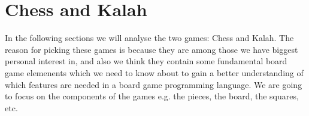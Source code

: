 \section{Chess and Kalah}

In the following sections we will analyse the two games: Chess and Kalah. The reason for picking these games is because they are among those we have biggest personal interest in, and also we think they contain some fundamental board game elemenents which we need to know about to gain a better understanding of which features are needed in a board game programming language. We are going to focus on the components of the games e.g. the pieces, the board, the squares, etc.


  

